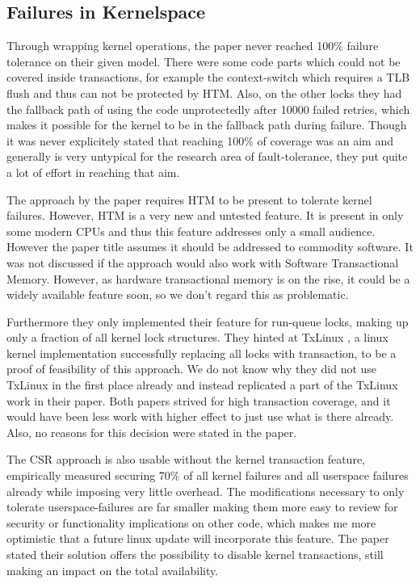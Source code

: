 \documentclass[a4paper,10pt,twoside]{article}
\begin{document}
\subsection{Failures in Kernelspace}
Through wrapping kernel operations, the paper never reached 100\% failure tolerance on their given model. There were some code parts which could not be covered inside transactions, for example the context-switch which requires a TLB flush and thus can not be protected by HTM. Also, on the other locks they had the fallback path of using the code unprotectedly after 10000 failed retries, which makes it possible for the kernel to be in the fallback path during failure. Though it was never explicitely stated that reaching 100\% of coverage was an aim and generally is very untypical for the research area of fault-tolerance, they put quite a lot of effort in reaching that aim.

The approach by the paper requires HTM to be present to tolerate kernel failures. However, HTM is a very new and untested %
feature. It is present in only some modern CPUs and thus this feature addresses only a small audience. However the paper title assumes it should be addressed to commodity software. It was not discussed if the approach would also work with Software Transactional Memory. However, as hardware transactional memory is on the rise, it could be a widely available feature soon, so we don't regard this as problematic.

Furthermore they only implemented their feature for run-queue locks, making up only a fraction of all kernel lock structures. They hinted at TxLinux \cite{TxLinux}, a linux kernel implementation successfully replacing all locks with transaction, to be a proof of feasibility of this approach. We do not know why they did not use TxLinux in the first place already and instead replicated a part of the TxLinux work in their paper. Both papers strived for high transaction coverage, and it would have been less work with higher effect to just use what is there already. Also, no reasons for this decision were stated in the paper.

The CSR approach is also usable without the kernel transaction feature, empirically measured securing 70\% of all kernel failures and all userspace failures already while imposing very little overhead. The modifications necessary to only tolerate userspace-failures are far smaller making them more easy to review for security or functionality implications on other code, which makes me more optimistic that a future linux update will incorporate this feature. The paper stated their solution offers the possibility to disable kernel transactions, still making an impact on the total availability.
\end{document}

